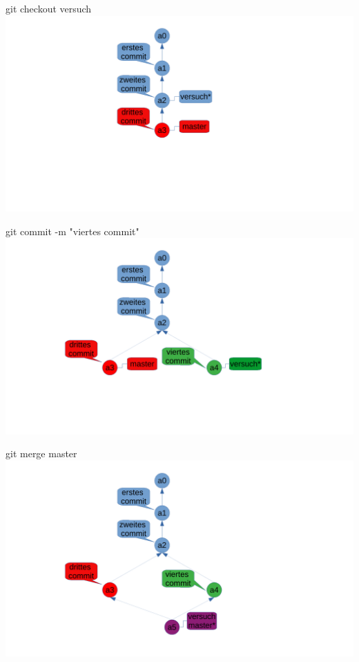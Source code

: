 \documentclass{beamer}
\begin{document}
\begin{frame}{git checkout versuch}
\includegraphics[scale=0.5]{pictures/checkout.pdf}
\end{frame}

\begin{frame}{git commit -m "viertes commit"}
\includegraphics[scale=0.5]{pictures/forth_commit.pdf}
\end{frame}

\begin{frame}{git merge master}
\includegraphics[scale=0.5]{pictures/merge.pdf}
\end{frame}
\end{document}
